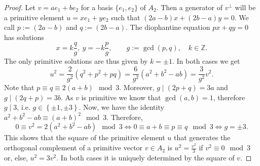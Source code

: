 \documentclass[10pt,a4paper]{amsart}
\newcommand{\bbZ}{\mathbb Z}
\begin{document}
\begin{proof}
    Let $v=ae_1+be_2$ for a basis $\{e_1, e_2\}$ of $A_2$. Then a generator of $v^{\perp}$ will be a primitive element $u=xe_1+ye_2$ such that $(2a-b)x+(2b-a)y=0$. We call $p:=(2a-b)$ and $q:=(2b-a)$. The diophantine equation $px+qy=0$ has solutions \begin{equation*}
        x=k\frac{q}{g},\ y=-k\frac{p}{g}, \qquad g:=\gcd(p,q),\quad k\in\bbZ.
    \end{equation*}
    The only primitive solutions are thus given by $k=\pm 1$. In both cases we get \begin{equation*}
        u^2=\frac{2}{g^2}\left(q^2+p^2+pq\right)=\frac{6}{g^2}\left(a^2+b^2-ab\right)=\frac{3}{g^2}v^2.
    \end{equation*}
    Note that $p\equiv q\equiv 2(a+b) \mod 3$. Moreover, $g\mid (2p+q)=3a$ and $g\mid (2q+p)=3b$. As $v$ is primitive we know that $\gcd(a,b)=1$, therefore $g\mid 3$, i.e. $g\in\left\{\pm 1,\pm 3\right\}$. Now, we have the identity $a^2+b^2-ab\equiv(a+b)^2 \mod 3$. Therefore,\begin{equation*}
        0\equiv v^2=2(a^2+b^2-ab) \mod 3\iff 0\equiv a+b\equiv p \equiv q\mod 3\iff g=\pm 3.
    \end{equation*}
    This shows that the square of the primitive element $u$ that generates the orthogonal complement of a primitive vector $v\in A_2$ is $u^2=\frac{v^2}{3}$ if $v^2\equiv 0\mod 3$ or, else, $u^2=3v^2$. In both cases it is uniquely determined by the square of $v$. 
\end{proof}
\end{document}
